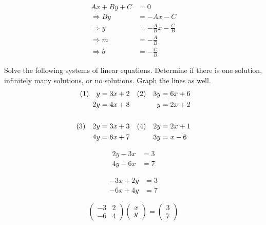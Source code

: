 \documentclass[crop=false,class=article,oneside]{standalone}
\begin{document}
        \begin{solution}
            \begin{align}
                Ax+By+C&=0\\
                \Rightarrow{B}y&=\minus{A}x-C\\
                \Rightarrow{y}&=\minus\frac{A}{B}x-\frac{C}{B}\\
                \Rightarrow{m}&=\minus\frac{A}{B}\\
                \Rightarrow{b}&=\minus\frac{C}{B}
            \end{align}
        \end{solution}
        \newpage
        \begin{problem}
            Solve the following systems of linear equations.
            Determine if there is one solution, infinitely many
            solutions, or no solutions. Graph the lines as well.
            \begin{align*}
                (1)\quad{y}&=3x+2&(2)\quad{3}y&=6x+6\\
                2y&=4x+8&y&=2x+2\\
                \hfill\\
                (3)\quad{2}y&=3x+3&(4)\quad{2}y&=2x+1\\
                4y&=6x+7&3y&=x-6
            \end{align*}
        \end{problem}
        \begin{align*}
            2y-3x&=3\\
            4y-6x&=7
        \end{align*}
        \par\hfill\par
        \begin{align*}
            \minus{3}x+2y&=3\\
            \minus{6}x+4y&=7
        \end{align*}
        \par\hfill\par
        \begin{equation}
            \begin{pmatrix}
                \minus{3}&2\\
                \minus{6}&4
            \end{pmatrix}
            \begin{pmatrix}
                x\\y
            \end{pmatrix}
            =
            \begin{pmatrix}
                3\\7
            \end{pmatrix}
        \end{equation}
\end{document}

